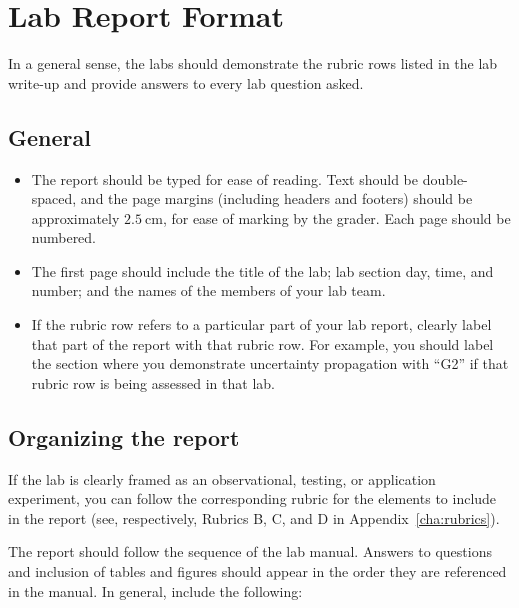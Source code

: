 \chapter{Lab Report Format}

In a general sense, the labs should demonstrate the rubric rows listed in the lab write-up and provide answers to every lab question asked.

\section{General}

\begin{itemize}
	\item The report should be typed for ease of reading. Text should be double-spaced, and the page margins (including headers and footers) should be approximately $2.5\:$cm, for ease of marking by the grader. Each page should be numbered.
	
	\item The first page should include the title of the lab; lab section day, time, and number; and the names of the members of your lab team.
	
	\item If the rubric row refers to a particular part of your lab report, clearly label that part of the report with that rubric row. For example, you should label the section where you demonstrate uncertainty propagation with ``G2'' if that rubric row is being assessed in that lab.
\end{itemize}

\section{Organizing the report}

If the lab is clearly framed as an observational, testing, or application experiment, you can follow the corresponding rubric for the elements to include in the report (see, respectively, Rubrics B, C, and D in Appendix~\ref{cha:rubrics}).

The report should follow the sequence of the lab manual. Answers to questions and inclusion of tables and figures should appear in the order they are referenced in the manual. In general, include the following:

